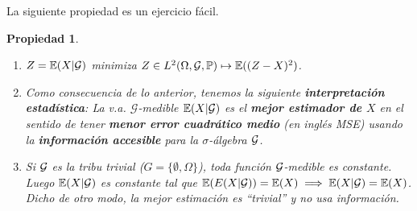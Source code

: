 \documentclass[letterpaper,11pt]{article} %
\theoremstyle{defbreak}
\theoremstyle{propbreak}
\newtheorem{property}{Propiedad}[subsection]
\theoremstyle{remark}
\theoremstyle{break}
\def\E{\mathbb{E}}
\def\P{\mathbb{P}}
\def\ejercicio{\color{blue}Ejercicio\color{black}}
\def\beforeitemize{\leavevmode \vspace{-0.5\baselineskip}}
\def\demejercicio{\begin{proof}\ejercicio\end{proof}}
\begin{document}
La siguiente propiedad es un ejercicio fácil.
\begin{property}
\beforeitemize
\begin{enumerate}
    \item $Z=\E(X|\G)$ minimiza $Z\in L^2(\Omega,\G,\P)\mapsto\E((Z-X)^2)$.
    \item Como consecuencia de lo anterior, tenemos la siguiente \textbf{interpretación estadística}: La v.a. $\mathcal{G}$-medible $\E(X|\G)$ es el \textbf{mejor estimador de $X$} en el sentido de tener \textbf{menor error cuadrático medio} (en inglés \textit{MSE}) usando la \textbf{información accesible} para la $\sigma$-álgebra $\mathcal{G}$.
    \item Si $\mathcal{G}$ es la tribu trivial ($G=\{\emptyset,\Omega\}$), toda función $\mathcal{G}$-medible es constante. Luego $\E(X|\G)$ es constante tal que $\E(E(X|\G))=\E(X)\implies\E(X|\G)=\E(X)$. \\ Dicho de otro modo, la mejor estimación es ``trivial'' y no usa información.
\end{enumerate}
\end{property}
\end{document}
